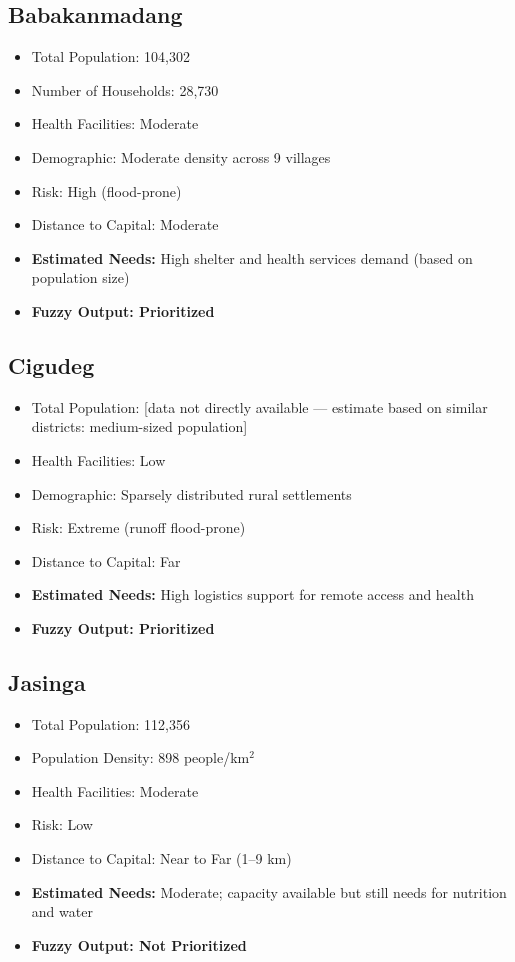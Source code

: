 \documentclass[journal,final,a4paper,twoside,11pt]{IEEEtran}
\begin{document}
\subsection{Babakanmadang}
\begin{itemize}
    \item Total Population: 104,302
    \item Number of Households: 28,730
    \item Health Facilities: Moderate
    \item Demographic: Moderate density across 9 villages
    \item Risk: High (flood-prone)
    \item Distance to Capital: Moderate
    \item \textbf{Estimated Needs:} High shelter and health services demand (based on population size)
    \item \textbf{Fuzzy Output: Prioritized}
\end{itemize}

\subsection{Cigudeg}
\begin{itemize}
    \item Total Population: [data not directly available — estimate based on similar districts: medium-sized population]
    \item Health Facilities: Low
    \item Demographic: Sparsely distributed rural settlements
    \item Risk: Extreme (runoff flood-prone)
    \item Distance to Capital: Far
    \item \textbf{Estimated Needs:} High logistics support for remote access and health
    \item \textbf{Fuzzy Output: Prioritized}
\end{itemize}

\subsection{Jasinga}
\begin{itemize}
    \item Total Population: 112,356
    \item Population Density: 898 people/km$^2$
    \item Health Facilities: Moderate
    \item Risk: Low
    \item Distance to Capital: Near to Far (1--9 km)
    \item \textbf{Estimated Needs:} Moderate; capacity available but still needs for nutrition and water
    \item \textbf{Fuzzy Output: Not Prioritized}
\end{itemize}
\end{document}
